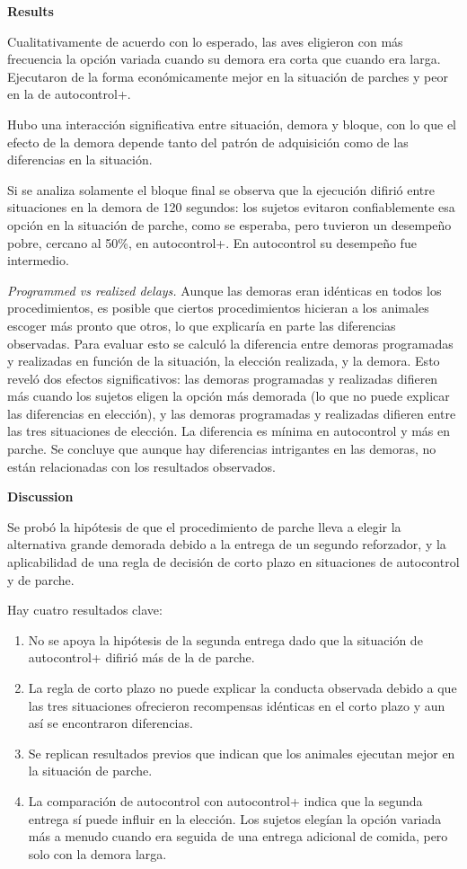 \documentclass[a4paper,12pt]{article}
\begin{document}
{\bfseries Results}

Cualitativamente de acuerdo con lo esperado, las aves eligieron con más frecuencia la opción variada cuando su demora era corta que cuando era larga. Ejecutaron de la forma económicamente mejor en la situación de parches y peor en la de autocontrol+.

Hubo una interacción significativa entre situación, demora y bloque, con lo que el efecto de la demora depende tanto del patrón de adquisición como de las diferencias en la situación.

Si se analiza solamente el bloque final se observa que la ejecución difirió entre situaciones en la demora de 120 segundos: los sujetos evitaron confiablemente esa opción en la situación de parche, como se esperaba, pero tuvieron un desempeño pobre, cercano al 50\%, en autocontrol+. En autocontrol su desempeño fue intermedio.

{\itshape Programmed vs realized delays.} Aunque las demoras eran idénticas en todos los procedimientos, es posible que ciertos procedimientos hicieran a los animales escoger más pronto que otros, lo que explicaría en parte las diferencias observadas. Para evaluar esto se calculó la diferencia entre demoras programadas y realizadas en función de la situación, la elección realizada, y la demora. Esto reveló dos efectos significativos: las demoras programadas y realizadas difieren más cuando los sujetos eligen la opción más demorada (lo que no puede explicar las diferencias en elección), y las demoras programadas y realizadas difieren entre las tres situaciones de elección. La diferencia es mínima en autocontrol y más en parche. Se concluye que aunque hay diferencias intrigantes en las demoras, no están relacionadas con los resultados observados.

{\bfseries Discussion}

Se probó la hipótesis de que el procedimiento de parche lleva a elegir la alternativa grande demorada debido a la entrega de un segundo reforzador, y la aplicabilidad de una regla de decisión de corto plazo en situaciones de autocontrol y de parche.

Hay cuatro resultados clave:

\begin{enumerate}
	\item No se apoya la hipótesis de la segunda entrega dado que la situación de autocontrol+ difirió más de la de parche.
	\item La regla de corto plazo no puede explicar la conducta observada debido a que las tres situaciones ofrecieron recompensas idénticas en el corto plazo y aun así se encontraron diferencias.
	\item Se replican resultados previos que indican que los animales ejecutan mejor en la situación de parche.
	\item La comparación de autocontrol con autocontrol+ indica que la segunda entrega sí puede influir en la elección. Los sujetos elegían la opción variada más a menudo cuando era seguida de una entrega adicional de comida, pero solo con la demora larga.
\end{enumerate}
\end{document}
